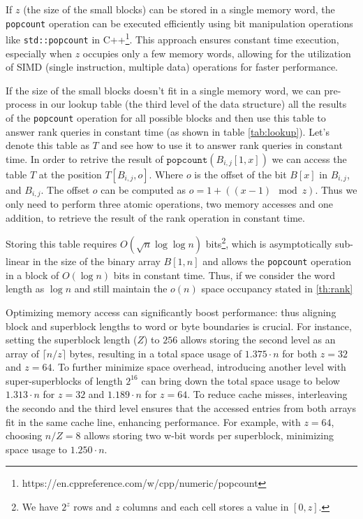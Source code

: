 \begin{remark}
    If $z$ (the size of the small blocks) can be stored in a single memory word, the \texttt{popcount} operation can be executed efficiently using bit manipulation operations like \texttt{std::popcount} in C++\footnote{https://en.cppreference.com/w/cpp/numeric/popcount}. This approach ensures constant time execution, especially when $z$ occupies only a few memory words, allowing for the utilization of SIMD (single instruction, multiple data) operations for faster performance. \cite{ferragina2023pearls}
\end{remark}

\noindent If the size of the small blocks doesn't fit in a single memory word, we can pre-process in our lookup table (the third level of the data structure) all the results of the \texttt{popcount} operation for all possible blocks and then use this table to answer rank queries in constant time (as shown in table \ref{tab:lookup}). Let's denote this table as $T$ and see how to use it to answer rank queries in constant time. In order to retrive the result of $\texttt{popcount}(B_{i,j}[1,x])$ we can access the table $T$ at the position $T[B_{i,j}, o]$. Where $o$ is the offset of the bit $B[x]$ in $B_{i,j}$, and $B_{i,j}$. The offset $o$ can be computed as $o = 1 + ((x-1) \mod z)$. Thus we only need to perform three atomic operations, two memory accesses and one addition, to retrieve the result of the rank operation in constant time. \vspace{0.4cm}

\noindent Storing this table requires $O(\sqrt{n} \log \log n)$ bits\footnote{We have $2^z$ rows and $z$ columns and each cell stores a value in $[0, z]$.}, which is asymptotically sub-linear in the size of the binary array $B[1, n]$ and allows the \texttt{popcount} operation in a block of $O(\log n)$ bits in constant time. Thus, if we consider the word length as $\log n$ and still maintain the $o(n)$ space occupancy stated in \ref{th:rank}  \vspace{0.4cm}


\begin{remark}
    Optimizing memory access can significantly boost performance: thus aligning block and superblock lengths to word or byte boundaries is crucial. For instance, setting the superblock length ($Z$) to $256$ allows storing the second level as an array of $\lceil n/z \rceil$ bytes, resulting in a total space usage of $1.375 \cdot n$ for both $z = 32$ and $z = 64$. To further minimize space overhead, introducing another level with super-superblocks of length $2^{16}$ can bring down the total space usage to below $1.313 \cdot n$ for $z = 32$ and $1.189 \cdot n$ for $z = 64$. To reduce cache misses, interleaving the secondo and the third level ensures that the accessed entries from both arrays fit in the same cache line, enhancing performance. For example, with $z = 64$, choosing $n/Z = 8$ allows storing two w-bit words per superblock, minimizing space usage to $1.250 \cdot n$. \cite{navarro2016compact}
\end{remark}

